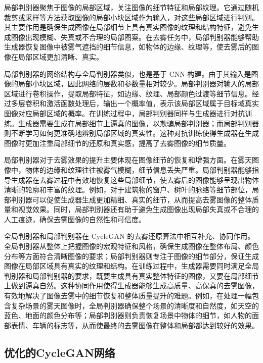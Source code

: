 局部判别器聚焦于图像的局部区域，关注图像的细节特征和局部纹理。它通过随机裁剪或采样等方法获取图像的局部小块区域作为输入，对这些局部区域进行判别。其主要作用是确保生成图像在局部细节上具有真实图像的纹理和结构特征，避免生成图像出现模糊、失真或不合理的局部图案。在去雾任务中，局部判别器能够帮助生成器恢复图像中被雾气遮挡的细节信息，如物体的边缘、纹理等，使去雾后的图像在局部区域更加清晰、真实。

局部判别器的网络结构与全局判别器类似，也是基于 CNN 构建。由于其输入是图像的局部小块区域，因此网络的层数和参数量相对较少。局部判别器对输入的局部区域进行卷积操作，提取局部特征，如边缘、纹理、局部颜色过渡等细节信息。经过多层卷积和激活函数处理后，输出一个概率值，表示该局部区域属于目标域真实图像对应局部区域的概率。在训练过程中，局部判别器同样与生成器进行对抗训练。生成器需要生成在局部细节上逼真的图像，以欺骗局部判别器；而局部判别器则不断学习如何更准确地辨别局部区域的真实性。这种对抗训练使得生成器在生成图像时更加注重局部细节的还原和真实感，提高了去雾图像的细节质量。


局部判别器对于去雾效果的提升主要体现在图像细节的恢复和增强方面。在雾天图像中，物体的边缘和纹理往往被雾气模糊，细节信息丢失严重。局部判别器能够指导生成器在去雾过程中有效地恢复这些局部细节，使去雾后的图像能够呈现出物体清晰的轮廓和丰富的纹理。例如，对于建筑物的窗户、树叶的脉络等细节部位，局部判别器可以促使生成器生成更加精细、真实的细节，从而提高去雾图像的整体质量和视觉效果。同时，局部判别器还有助于避免生成图像出现局部失真或不合理的人工痕迹，确保去雾图像的自然性和可信度。


全局判别器和局部判别器在 CycleGAN 的去雾还原算法中相互补充、协同作用。全局判别器从整体上把握图像的宏观特征和风格，确保生成图像在整体布局、颜色分布等方面符合清晰图像的要求；局部判别器则专注于图像的细节部分，保证生成图像在局部区域具有真实的纹理和结构。在训练过程中，生成器需要同时满足全局判别器和局部判别器的要求，既要生成具有真实整体特征的图像，又要在局部细节上做到逼真自然。这种协同作用使得生成器能够生成高质量、高保真的去雾图像，有效地解决了图像去雾中的细节恢复和整体质量提升的难题。例如，在处理一幅包含复杂场景的雾天图像时，全局判别器确保整个场景的清晰度和自然度，如天空的蓝色、地面的颜色分布等；局部判别器则负责恢复场景中物体的细节，如人物的面部表情、车辆的标志等，从而使最终的去雾图像在整体和局部都达到较好的效果。

\subsection{优化的CycleGAN网络}

